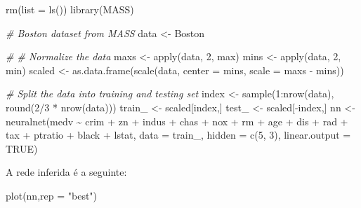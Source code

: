 \documentclass[
]{article}
\newenvironment{Shaded}{\begin{snugshade}}{\end{snugshade}}
\newcommand{\AttributeTok}[1]{\textcolor[rgb]{0.77,0.63,0.00}{#1}}
\newcommand{\CommentTok}[1]{\textcolor[rgb]{0.56,0.35,0.01}{\textit{#1}}}
\newcommand{\ConstantTok}[1]{\textcolor[rgb]{0.00,0.00,0.00}{#1}}
\newcommand{\DecValTok}[1]{\textcolor[rgb]{0.00,0.00,0.81}{#1}}
\newcommand{\FunctionTok}[1]{\textcolor[rgb]{0.00,0.00,0.00}{#1}}
\newcommand{\NormalTok}[1]{#1}
\newcommand{\OtherTok}[1]{\textcolor[rgb]{0.56,0.35,0.01}{#1}}
\newcommand{\SpecialCharTok}[1]{\textcolor[rgb]{0.00,0.00,0.00}{#1}}
\newcommand{\StringTok}[1]{\textcolor[rgb]{0.31,0.60,0.02}{#1}}
\begin{document}
\begin{Shaded}
\begin{Highlighting}[]
\FunctionTok{rm}\NormalTok{(}\AttributeTok{list =} \FunctionTok{ls}\NormalTok{())}
\FunctionTok{library}\NormalTok{(MASS)}

\CommentTok{\# Boston dataset from MASS}
\NormalTok{data }\OtherTok{\textless{}{-}}\NormalTok{ Boston}

\CommentTok{\# \# Normalize the data}
\NormalTok{maxs }\OtherTok{\textless{}{-}} \FunctionTok{apply}\NormalTok{(data, }\DecValTok{2}\NormalTok{, max)}
\NormalTok{mins }\OtherTok{\textless{}{-}} \FunctionTok{apply}\NormalTok{(data, }\DecValTok{2}\NormalTok{, min)}
\NormalTok{scaled }\OtherTok{\textless{}{-}} \FunctionTok{as.data.frame}\NormalTok{(}\FunctionTok{scale}\NormalTok{(data, }\AttributeTok{center =}\NormalTok{ mins,}
                              \AttributeTok{scale =}\NormalTok{ maxs }\SpecialCharTok{{-}}\NormalTok{ mins))}

\CommentTok{\# Split the data into training and testing set}
\NormalTok{index }\OtherTok{\textless{}{-}} \FunctionTok{sample}\NormalTok{(}\DecValTok{1}\SpecialCharTok{:}\FunctionTok{nrow}\NormalTok{(data), }\FunctionTok{round}\NormalTok{(}\DecValTok{2}\SpecialCharTok{/}\DecValTok{3} \SpecialCharTok{*} \FunctionTok{nrow}\NormalTok{(data)))}
\NormalTok{train\_ }\OtherTok{\textless{}{-}}\NormalTok{ scaled[index,]}
\NormalTok{test\_ }\OtherTok{\textless{}{-}}\NormalTok{ scaled[}\SpecialCharTok{{-}}\NormalTok{index,]}
\NormalTok{nn }\OtherTok{\textless{}{-}} \FunctionTok{neuralnet}\NormalTok{(medv }\SpecialCharTok{\textasciitilde{}}\NormalTok{ crim }\SpecialCharTok{+}\NormalTok{ zn }\SpecialCharTok{+}\NormalTok{ indus }\SpecialCharTok{+}\NormalTok{ chas }\SpecialCharTok{+}\NormalTok{ nox }
                \SpecialCharTok{+}\NormalTok{ rm }\SpecialCharTok{+}\NormalTok{ age }\SpecialCharTok{+}\NormalTok{ dis }\SpecialCharTok{+}\NormalTok{ rad }\SpecialCharTok{+}\NormalTok{ tax }\SpecialCharTok{+} 
\NormalTok{                  ptratio }\SpecialCharTok{+}\NormalTok{ black }\SpecialCharTok{+}\NormalTok{ lstat, }
                \AttributeTok{data =}\NormalTok{ train\_, }\AttributeTok{hidden =} \FunctionTok{c}\NormalTok{(}\DecValTok{5}\NormalTok{, }\DecValTok{3}\NormalTok{), }
                \AttributeTok{linear.output =} \ConstantTok{TRUE}\NormalTok{)}
\end{Highlighting}
\end{Shaded}

A rede inferida é a seguinte:

\begin{Shaded}
\begin{Highlighting}[]
\FunctionTok{plot}\NormalTok{(nn,}\AttributeTok{rep =} \StringTok{"best"}\NormalTok{)}
\end{Highlighting}
\end{Shaded}
\end{document}
